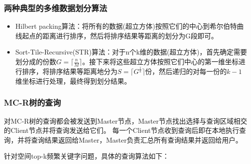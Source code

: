 \documentclass{elegantpaper}
\begin{document}
\subsubsection{两种典型的多维数据划分算法}

\begin{itemize}
    
    \item Hilbert packing算法：将所有的数据(超立方体)按照它们的中心到希尔伯特曲线起点的距离进行排序，然后将排序结果等距离的划分为G段即可。

    \item Sort-Tile-Recursive(STR)算法：对于n个k维的数据(超立方体)，首先确定需要划分成的份数$G = \lceil \frac{n}{M} \rceil$。接下来将这些超立方体按照它们中心的第一维坐标进行排序，将排序结果等距离地分为$S = \lceil G^{\frac{1}{k}} \rceil$份，然后递归的对每一份的$k - 1$维坐标进行处理，最终得到划分结果。

\end{itemize}

\subsubsection{MC-R树的查询}

对MC-R树的查询都会被发送到Master节点，Master节点找出选择与查询区域相交的Client节点并将查询发送给它们。
每一个Client节点收到查询后即在本地执行查询，并将查询结果返回给Master，Master负责汇总所有查询结果并返回给用户。

\noindent 针对空间top-k频繁关键字问题，具体的查询算法如下：
\end{document}
